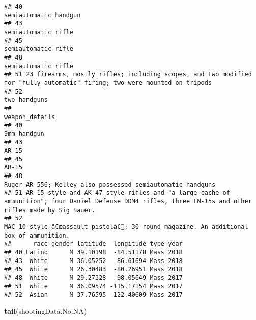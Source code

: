 \documentclass[
]{article}
\newenvironment{Shaded}{\begin{snugshade}}{\end{snugshade}}
\newcommand{\FunctionTok}[1]{\textcolor[rgb]{0.13,0.29,0.53}{\textbf{#1}}}
\newcommand{\NormalTok}[1]{#1}
\begin{document}
\begin{verbatim}
## 40                                                                                                    semiautomatic handgun
## 43                                                                                                      semiautomatic rifle
## 45                                                                                                      semiautomatic rifle
## 48                                                                                                      semiautomatic rifle
## 51 23 firearms, mostly rifles; including scopes, and two modified for "fully automatic" firing; two were mounted on tripods
## 52                                                                                                             two handguns
##                                                                                                                                             weapon_details
## 40                                                                                                                                             9mm handgun
## 43                                                                                                                                                   AR-15
## 45                                                                                                                                                   AR-15
## 48                                                                                              Ruger AR-556; Kelley also possessed semiautomatic handguns
## 51 AR-15-style and AK-47-style rifles and "a large cache of ammunition"; four Daniel Defense DDM4 rifles, three FN-15s and other rifles made by Sig Sauer.
## 52                                                                  MAC-10-style â€œassault pistolâ€; 30-round magazine. An additional box of ammunition.
##      race gender latitude  longitude type year
## 40 Latino      M 39.10198  -84.51178 Mass 2018
## 43  White      M 36.05252  -86.61694 Mass 2018
## 45  White      M 26.30483  -80.26951 Mass 2018
## 48  White      M 29.27328  -98.05649 Mass 2017
## 51  White      M 36.09574 -115.17154 Mass 2017
## 52  Asian      M 37.76595 -122.40609 Mass 2017
\end{verbatim}

\begin{Shaded}
\begin{Highlighting}[]
\FunctionTok{tail}\NormalTok{(shootingData.No.NA)}
\end{Highlighting}
\end{Shaded}
\end{document}
